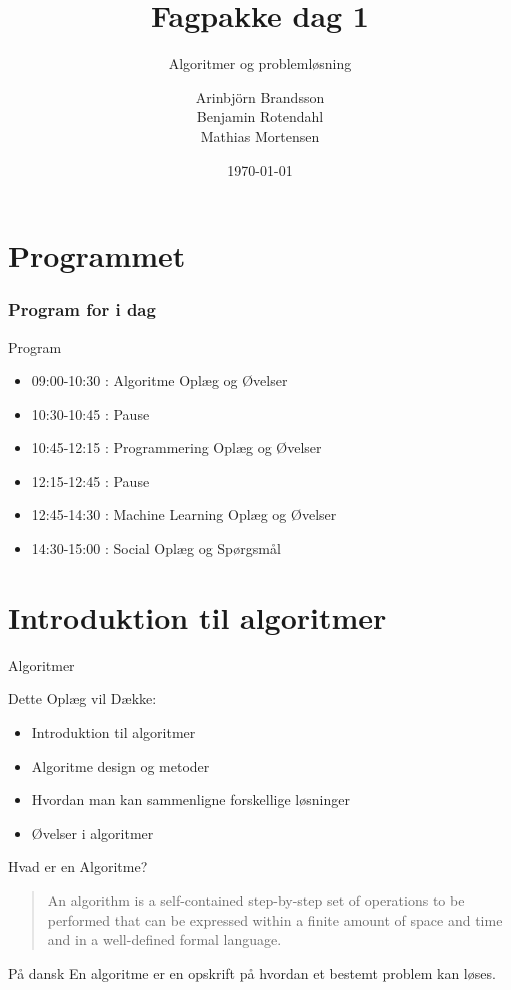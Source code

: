 \documentclass[12pt,t]{beamer}
\title{Fagpakke dag 1}
\subtitle{Algoritmer og problemløsning}
\author{
        Arinbjörn Brandsson \\
        Benjamin Rotendahl  \\
        Mathias Mortensen
}
\date[]{\today}
\begin{document}
\frame[plain]{\titlepage}
 \frame{\tableofcontents}

\section{Programmet}

\begin{frame}
    \frametitle{Program for i dag}
    \begin{block}{Program}
        \begin{itemize}
            \item 09:00-10:30 : Algoritme Oplæg og Øvelser
            \item 10:30-10:45 : Pause
            \item 10:45-12:15 : Programmering Oplæg og Øvelser
            \item 12:15-12:45 : Pause
            \item 12:45-14:30 : Machine Learning Oplæg og Øvelser
            \item 14:30-15:00 : Social Oplæg og Spørgsmål 
        \end{itemize}
    \end{block}
\end{frame}


\section{Introduktion til algoritmer}
    \begin{frame}{Algoritmer}
    \begin{block}{Dette Oplæg vil Dække:}
        \begin{itemize}
            \item Introduktion til algoritmer
            \item Algoritme design og metoder
            \item Hvordan man kan sammenligne forskellige løsninger
            \item Øvelser i algoritmer
        \end{itemize}
    \end{block}
    \end{frame}

    \begin{frame}[c]{Hvad er en Algoritme?}
        \begin{quote}
            An algorithm is a self-contained step-by-step set of operations to
            be performed that can be expressed within a finite amount of space
            and time and in a well-defined formal language.
        \end{quote}
        \pause
        \begin{block}{På dansk}
            En algoritme er en \alert{opskrift} på hvordan et bestemt problem
            kan løses.
        \end{block}
    \end{frame}
\end{document}
